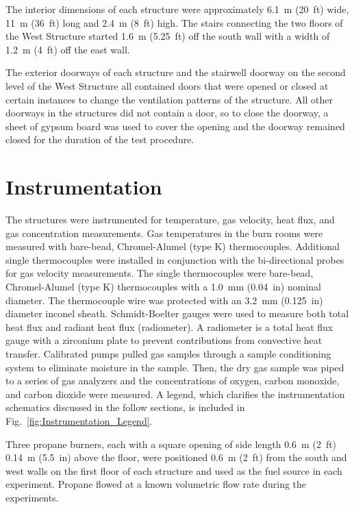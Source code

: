 \documentclass[12pt,oneside]{book}
\begin{document}
The interior dimensions of each structure were approximately 6.1~m (20~ft) wide, 11~m (36~ft) long and 2.4~m (8~ft) high. The stairs connecting the two floors of the West Structure started 1.6~m (5.25~ft) off the south wall with a width of 1.2~m (4~ft) off the east wall.

The exterior doorways of each structure and the stairwell doorway on the second level of the West Structure all contained doors that were opened or closed at certain instances to change the ventilation patterns of the structure. All other doorways in the structures did not contain a door, so to close the doorway, a sheet of gypsum board was used to cover the opening and the doorway remained closed for the duration of the test procedure.
\FloatBarrier

\section{Instrumentation}
\label{sec:Instrumentation}
The structures were instrumented for temperature, gas velocity, heat flux, and gas concentration measurements. Gas temperatures in the burn rooms were measured with bare-bead, Chromel-Alumel (type K) thermocouples. Additional single thermocouples were installed in conjunction with the bi-directional probes for gas velocity measurements. The single thermocouples were bare-bead, Chromel-Alumel (type K) thermocouples with a 1.0~mm (0.04~in) nominal diameter. The thermocouple wire was protected with an 3.2~mm (0.125~in) diameter inconel sheath. Schmidt-Boelter gauges were used to measure both total heat flux and radiant heat flux (radiometer). A radiometer is a total heat flux gauge with a zirconium plate to prevent contributions from convective heat transfer. Calibrated pumps pulled gas samples through a sample conditioning system to eliminate moisture in the sample. Then, the dry gas sample was piped to a series of gas analyzers and the concentrations of oxygen, carbon monoxide, and carbon dioxide were measured. A legend, which clarifies the instrumentation schematics discussed in the follow sections, is included in Fig.~\ref{fig:Instrumentation_Legend}.


Three propane burners, each with a square opening of side length 0.6~m (2~ft) 0.14~m (5.5~in) above the floor, were positioned 0.6~m (2~ft) from the south and west walls on the first floor of each structure and used as the fuel source in each experiment. Propane flowed at a known volumetric flow rate during the experiments.
\FloatBarrier
\end{document}
